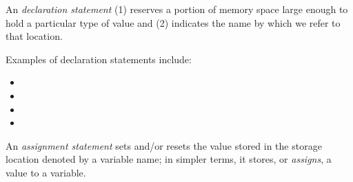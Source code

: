 \begin{definition}
An \emph{declaration statement} (1) reserves a portion of memory space large enough to hold a particular type of value and (2) indicates the name by which we refer to that location.
\end{definition}

\noindent Examples of declaration statements include:
\begin{itemize}
 \item {}
 \item {}
 \item {}
 \item {}
\end{itemize}

\begin{definition}
An \emph{assignment statement} sets and/or resets the value stored in the storage location denoted by a variable name; in simpler terms, it stores, or \emph{assigns}, a value to a variable.
\end{definition}

